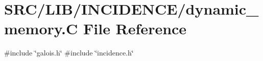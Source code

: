\hypertarget{dynamic__memory_8_c}{}\section{S\+R\+C/\+L\+I\+B/\+I\+N\+C\+I\+D\+E\+N\+C\+E/dynamic\+\_\+memory.C File Reference}
\label{dynamic__memory_8_c}
{\ttfamily \#include \char`\"{}galois.\+h\char`\"{}}\newline
{\ttfamily \#include \char`\"{}incidence.\+h\char`\"{}}\newline
